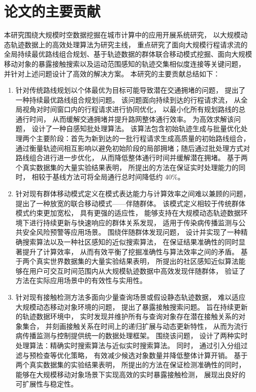 \section{论文的主要贡献}

本研究围绕大规模时空数据挖掘在城市计算中的应用开展系统研究， 以大规模动态轨迹数据上的高效处理算法为研究主线， 重点研究了面向大规模行程请求流的全局持续最优路线组合规划、基于轨迹数据的群体联合移动模式挖掘、面向大规模移动对象的暴露接触搜索以及运动范围感知的轨迹交集相似度连接等关键问题， 并针对上述问题设计了高效的解决方案。 本研究的主要贡献总结如下：
\begin{enumerate}
    \item 针对传统路线规划以个体最优为目标可能导致潜在交通拥堵的问题， 提出了一种持续最优路线组合规划问题。 该问题面向持续到达的行程请求流， 从全局视角对时间窗口内的行程请求进行协同优化， 以最小化所有规划路线的总通行时间， 从而缓解交通拥堵并提升路网整体通行效率。 为高效求解该问题， 设计了一种自感知批处理算法。 该算法包含初始轨迹生成与批量优化处理两个主要阶段：首先为新到达的一批行程请求生成高质量的初始路线组合， 通过衡量轨迹间相互影响以避免初始阶段的局部拥堵；随后通过批处理方式对路线组合进行进一步优化， 从而降低整体通行时间并缓解潜在拥堵。 基于两个真实数据集的大量实验结果表明， 所提出的方法在保证实时处理能力的同时， 相较于基线方法可将全局通行总时间降低约 40\%。

    \item
    针对现有群体移动模式定义在模式表达能力与计算效率之间难以兼顾的问题， 提出了一种放宽的联合移动模式——伴随群体。 该模式定义相较于传统群体模式约束更加宽松， 具有更强的适应性， 能够支持在大规模动态轨迹数据环境下进行持续更新与快速响应的群体关系发现， 适用于传染病传播监测与公共安全风险预警等应用场景。 围绕伴随群体发现问题， 设计并实现了一种精确搜索算法以及一种社区感知的近似搜索算法， 在保证结果准确性的同时显著提升了计算效率， 从而有效平衡了挖掘准确性与算法效率之间的矛盾。 基于两个真实世界数据集的大量实验结果表明， 所提出的社区感知近似算法能够在用户可交互时间范围内从大规模轨迹数据中高效发现伴随群体， 验证了方法在实际应用场景中的有效性与实用性。

    \item
    针对现有接触检测方法多面向少量查询场景或假设静态轨迹数据， 难以适应大规模动态移动对象环境的问题， 提出了暴露接触搜索问题。 旨在持续更新的轨迹数据环境中， 实时发现并维护所有与查询对象存在潜在接触关系的对象集合， 并刻画接触关系在时间上的递归扩展与动态更新特性， 从而为流行病传播监测与控制提供统一的数据处理框架。 围绕该问题， 设计了两种实时处理算法：精确实时搜索算法与近似实时搜索算法。 同时， 通过引入分组过滤与预检查等优化策略， 有效减少候选对象数量并降低整体计算开销。 基于两个真实数据集的实验结果表明， 所提出的方法在保证检测准确性的同时， 能够在大规模移动对象场景下实现高效的实时暴露接触检测， 展现出良好的可扩展性与稳定性。


\end{enumerate}
